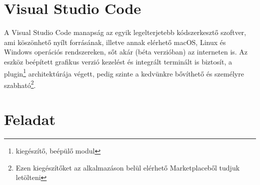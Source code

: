 \section{Visual Studio Code}
A Visual Studio Code manapság az egyik legelterjetebb kódszerkesztő szoftver, ami köszönhető nyílt forrásának, illetve annak elérhető macOS, Linux és Windows operációs rendszereken, sőt akár (béta verzióban) az interneten is. Az eszköz beépített grafikus verzió kezelést és integrált terminált is biztosít, a plugin\footnote{kiegészítő, beépülő modul} architektúrája végett, pedig szinte a kedvünkre bővíthető és személyre szabható\footnote{Ezen kiegészítőket az alkalmazáson belül elérhető Marketplaceből tudjuk letölteni}.

\section{Feladat}
